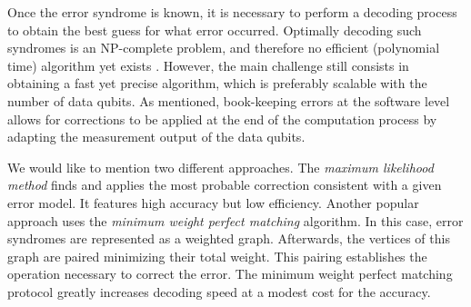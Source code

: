 Once the error syndrome is known, it is necessary to perform a decoding process
to obtain the best guess for what error occurred. Optimally decoding such
syndromes is an NP-complete problem, and therefore no efficient (polynomial
time) algorithm yet exists \cite{Berlekamp}. However, the main challenge still
consists in obtaining a fast yet precise algorithm, which is preferably scalable
with the number of data qubits. As mentioned, book-keeping errors at the
software level allows for corrections to be applied at the end of the
computation process by adapting the measurement output of the data qubits.

We would like to mention two different approaches. The \textit{maximum
  likelihood method} \cite{Varsamopoulos_2020} finds and applies the most probable
correction consistent with a given error model. It features high accuracy but
low efficiency. Another popular approach uses the \textit{minimum weight perfect
  matching} \cite{fowler2013minimum} algorithm. In this case, error syndromes
are represented as a weighted graph. Afterwards, the vertices of this graph are
paired minimizing their total weight. This pairing establishes the operation
necessary to correct the error. The minimum weight perfect
matching protocol greatly increases decoding speed at a modest cost for the
accuracy.


